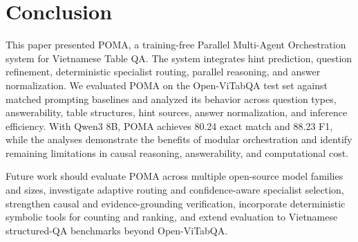 \documentclass[]{interact}
\begin{document}

\section{Conclusion}\label{sec:conclusion}

This paper presented POMA, a training-free Parallel Multi-Agent Orchestration system for Vietnamese Table QA. The system integrates hint prediction, question refinement, deterministic specialist routing, parallel reasoning, and answer normalization. We evaluated POMA on the Open-ViTabQA test set against matched prompting baselines and analyzed its behavior across question types, answerability, table structures, hint sources, answer normalization, and inference efficiency. With Qwen3 8B, POMA achieves 80.24 exact match and 88.23 F1, while the analyses demonstrate the benefits of modular orchestration and identify remaining limitations in causal reasoning, answerability, and computational cost.

Future work should evaluate POMA across multiple open-source model families and sizes, investigate adaptive routing and confidence-aware specialist selection, strengthen causal and evidence-grounding verification, incorporate deterministic symbolic tools for counting and ranking, and extend evaluation to Vietnamese structured-QA benchmarks beyond Open-ViTabQA.
\end{document}
